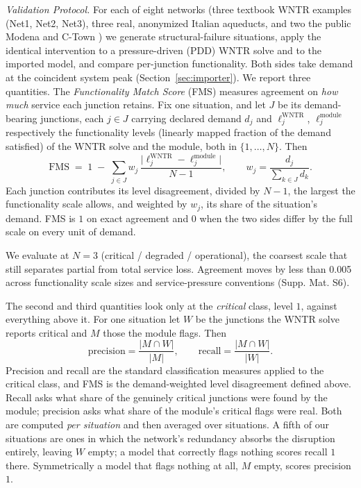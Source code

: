 \documentclass{svproc}
\begin{document}
  \emph{Validation Protocol.} For each of eight networks (three textbook WNTR examples
  (Net1, Net2, Net3), three real, anonymized Italian aqueducts, and two the public
  Modena and C-Town \cite{kentucky_water_resources_research_institute_university_of_kentucky_water_nodate})
  we generate structural-failure situations,
  apply the identical intervention to a pressure-driven (PDD) WNTR solve and to
  the imported model, and compare per-junction functionality. Both sides take
  demand at the coincident system peak (Section~\ref{sec:importer}). We report three
  quantities. The \emph{Functionality Match Score} (FMS) measures agreement on
  \emph{how much} service each junction retains. Fix one situation, and let $J$ be its
  demand-bearing junctions, each $j \in J$ carrying declared demand $d_j$ and $\ell^{\mathrm{WNTR}}_j$, $\ell^{\mathrm{module}}_j$
  respectively the functionality levels (linearly mapped fraction of the demand satisfied) of the WNTR solve and the module,
  both in $\{1,\ldots,N\}$. Then
  \[
    \mathrm{FMS} \;=\; 1 \;-\; \sum_{j \in J} w_j\,
    \frac{\bigl|\ell^{\mathrm{WNTR}}_j - \ell^{\mathrm{module}}_j\bigr|}{N-1},
    \qquad w_j = \frac{d_j}{\sum_{k \in J} d_k}.
  \]
  Each junction contributes its level disagreement, divided by $N-1$, the largest the functionality scale
  allows, and weighted by $w_j$, its share of the situation's demand. FMS is $1$ on exact
  agreement and $0$ when the two sides differ by the full scale on every unit of demand.

  We evaluate at $N=3$ (critical / degraded / operational), the coarsest scale that still
  separates partial from total service loss. Agreement moves by less than 0.005 across functionality scale sizes and service-pressure conventions (Supp. Mat. S6).

  The second and third quantities look only at the \emph{critical} class, level $1$,
  against everything above it. For one situation let $W$ be the junctions the WNTR
  solve reports critical and $M$ those the module flags. Then
  \[
    \mathrm{precision} = \frac{|M \cap W|}{|M|},
    \qquad
    \mathrm{recall} = \frac{|M \cap W|}{|W|}.
  \]
  Precision and recall are the standard classification measures applied to the critical class, and FMS is the
  demand-weighted level disagreement defined above. Recall asks what share of the genuinely critical junctions were found by the module; precision asks
  what share of the module's critical flags were real. Both are computed \emph{per situation} and then
  averaged over situations. A
  fifth of our situations are ones in which the network's redundancy absorbs the
  disruption entirely, leaving $W$ empty; a model that correctly flags nothing scores
  recall $1$ there. Symmetrically a model that flags nothing at all,
  $M$ empty, scores precision $1$.
\end{document}
